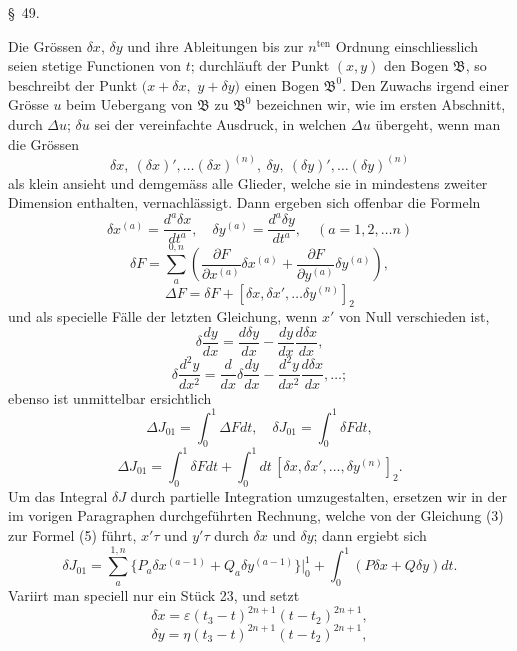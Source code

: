 \documentclass[11pt,a4paper,leqno]{article}
\begin{document}
\begin{center}
{\large \S~49.}
\end{center}

Die Grössen $\delta x$, $\delta y$ und ihre Ableitungen bis zur $n^{\mathrm{ten}}$ Ordnung einschliesslich seien stetige Functionen von $t$; durchläuft der Punkt $(x,y)$ den Bogen $\mathfrak B$, so beschreibt der Punkt $(x+\delta x,$
$y+\delta y)$ einen Bogen $\mathfrak B^0$. Den Zuwachs irgend einer Grösse $u$ beim Uebergang von $\mathfrak B$ zu $\mathfrak B^0$ bezeichnen wir, wie im ersten Abschnitt, durch $\Delta u$; $\delta u$ sei der vereinfachte Ausdruck, in welchen $\Delta u$ übergeht, wenn man die Grössen
\[
\delta x,\ (\delta x)',\ldots (\delta x)^{(n)},\ \delta y,\ (\delta y)',\ldots (\delta y)^{(n)}
\]
als klein ansieht und demgemäss alle Glieder, welche sie in mindestens zweiter Dimension enthalten, vernachlässigt. Dann ergeben sich offenbar die Formeln
\[
\delta x^{(a)}=\frac{d^a\delta x}{dt^a},\quad
\delta y^{(a)}=\frac{d^a\delta y}{dt^a},\quad (a=1,2,\ldots n)
\]
\[
\delta F=\sum_a^{0,n}\left(\frac{\partial F}{\partial x^{(a)}}\delta x^{(a)}+\frac{\partial F}{\partial y^{(a)}}\delta y^{(a)}\right),
\]
\[
\Delta F=\delta F+[\delta x,\delta x',\ldots \delta y^{(n)}]_2
\]
und als specielle Fälle der letzten Gleichung, wenn $x'$ von Null verschieden ist,
\[
\delta\frac{dy}{dx}=\frac{d\delta y}{dx}-\frac{dy}{dx}\frac{d\delta x}{dx},
\]
\[
\delta\frac{d^2y}{dx^2}=\frac{d}{dx}\delta\frac{dy}{dx}-\frac{d^2y}{dx^2}\frac{d\delta x}{dx},\ldots;
\]
ebenso ist unmittelbar ersichtlich
\[
\Delta J_{01}=\int_0^1\Delta Fdt,
\quad
\delta J_{01}=\int_0^1\delta Fdt,
\]
\begin{equation}\tag{9}
\Delta J_{01}=\int_0^1\delta Fdt+\int_0^1dt\,[\delta x,\delta x',\ldots,\delta y^{(n)}]_2.
\end{equation}
Um das Integral $\delta J$ durch partielle Integration umzugestalten, ersetzen wir in der im vorigen Paragraphen durchgeführten Rechnung, welche von der Gleichung (3) zur Formel (5) führt, $x'\tau$ und $y'\tau$ durch $\delta x$ und $\delta y$; dann ergiebt sich
\begin{equation}\tag{10}
\delta J_{01}=\sum_a^{1,n}\{P_a\delta x^{(a-1)}+Q_a\delta y^{(a-1)}\}\bigg|_0^1
+\int_0^1(P\delta x+Q\delta y)dt.
\end{equation}
Variirt man speciell nur ein Stück 23, und setzt
\[
\delta x=\varepsilon(t_3-t)^{2n+1}(t-t_2)^{2n+1},
\]
\[
\delta y=\eta(t_3-t)^{2n+1}(t-t_2)^{2n+1},
\]
\end{document}
